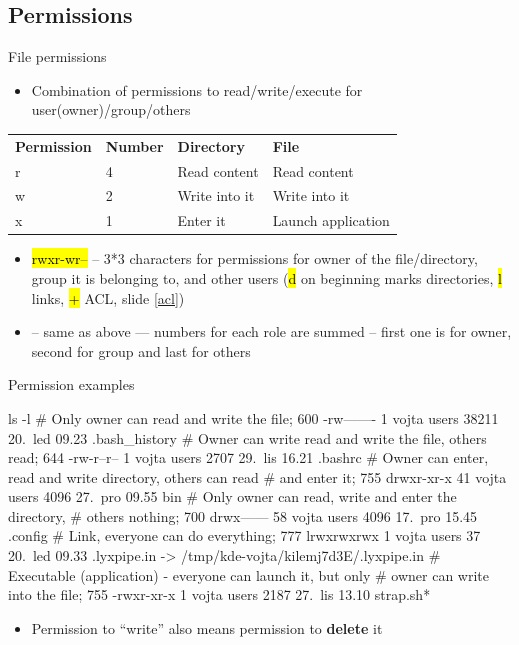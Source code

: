 \documentclass[compress, ucs, xelatex, 11pt, xcolor=svgnames,
  hyperref={
    bookmarks=true,
    unicode=true,
    colorlinks=true,
    pdftitle={Linux, command line and MetaCentrum},
    plainpages=false,
    pdfauthor={Vojtech Zeisek},
    pdfsubject={Course about use of Linux command line, writing shell scripts and using MetaCentrum of CESNET},
    pdfcreator={XeLaTeX},
    pdfkeywords={Linux, GNU, BASH, shell, command line, MetaCentrum},
    linkcolor=Red,
    anchorcolor=Blue,
    citecolor=Purple,
    filecolor=DodgerBlue,
    menucolor=DarkOrchid,
    urlcolor=DeepSkyBlue,
    pdftex},
  url={hyphens, lowtilde} %
  ]{beamer}
\renewcommand{\texttt}[1]{\hl{\ttfamily #1}}
\begin{document}
\subsection{Permissions}

\begin{frame}{File permissions}
\begin{itemize}
  \item Combination of permissions to read/write/execute for user(owner)/group/others
\end{itemize}
\begin{center}
\begin{tabular}{llll}
\textbf{Permission} & \textbf{Number} & \textbf{Directory} & \textbf{File}\\
r & 4 & Read content & Read content\\
w & 2 & Write into it & Write into it\\
x & 1 & Enter it & Launch application \\
\end{tabular}
\end{center}
\begin{itemize}
  \item \texttt{rwxr-wr--} -- 3*3 characters for permissions for owner of the file/directory, group it is belonging to, and other users (\texttt{d} on beginning marks directories, \texttt{l} links, \texttt{+} ACL, slide \ref{acl})
  \item \texttt{764} -- same as above --- numbers for each role are summed -- first one is for owner, second for group and last for others
\end{itemize}
\end{frame}

\begin{frame}[fragile]{Permission examples}
  \begin{bashcode}
    ls -l
    # Only owner can read and write the file; 600
    -rw-------   1 vojta users   38211 20. led 09.23 .bash_history
    # Owner can write read and write the file, others read; 644
    -rw-r--r--   1 vojta users    2707 29. lis 16.21 .bashrc
    # Owner can enter, read and write directory, others can read
    # and enter it; 755
    drwxr-xr-x  41 vojta users    4096 27. pro 09.55 bin
    # Only owner can read, write and enter the directory,
    # others nothing; 700
    drwx------  58 vojta users    4096 17. pro 15.45 .config
    # Link, everyone can do everything; 777
    lrwxrwxrwx   1 vojta users      37 20. led 09.33 .lyxpipe.in ->
      /tmp/kde-vojta/kilemj7d3E/.lyxpipe.in
    # Executable (application) - everyone can launch it, but only
    # owner can write into the file; 755
    -rwxr-xr-x   1 vojta users    2187 27. lis 13.10 strap.sh*
  \end{bashcode}
  \vfil
  \begin{itemize}
    \item Permission to ``write'' also means permission to \textbf{delete} it
  \end{itemize}
\end{frame}
\end{document}
